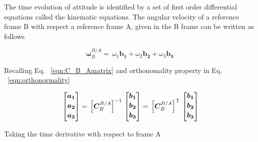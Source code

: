 The time evolution of attitude is identified by a set of first order differential equations called the kinematic equations. 
The angular velocity of a reference frame B with respect a reference frame A, given in the B frame can be written as follows

\begin{equation}\label{eqn:quaternion1}
\bm{\omega}_B^{B/A}
 =\,
\omega_1 \bm{b_1} + \omega_2 \bm{b_2} + \omega_3 \bm{b_3}
\end{equation}

Recalling Eq. ~\ref{eqn:C_B_Amatrix} and orthonomality property in Eq. ~\ref{eqn:orthonormality}

\begin{equation}{\label{eqn:kinematicsDerivation1}}
\begin{bmatrix}
\bm{a_1}\\[0.2em]
\bm{a_2}\\[0.2em]
\bm{a_3}\\[0.2em]
\end{bmatrix}
=\,
\Big[{\bm{C}_B^{B/A}}\Big]^{-1}
\,
\begin{bmatrix}
\bm{b_1}\\[0.2em]
\bm{b_2}\\[0.2em]
\bm{b_3}\\[0.2em]
\end{bmatrix}
=\,
\Big[{\bm{C}_B^{B/A}}\Big]^{\rm T}
\,
\begin{bmatrix}
\bm{b_1}\\[0.2em]
\bm{b_2}\\[0.2em]
\bm{b_3}\\[0.2em]
\end{bmatrix}
\end{equation} 

Taking the time derivative with respect to frame A

